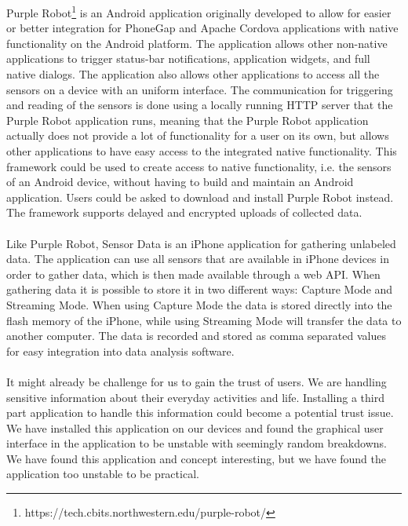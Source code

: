 Purple Robot\footnote{https://tech.cbits.northwestern.edu/purple-robot/} is an Android application originally developed to allow for easier or better integration for PhoneGap and Apache Cordova applications with native functionality on the Android platform. The application allows other non-native applications to trigger status-bar notifications, application widgets, and full native dialogs. 
The application also allows other applications to access all the sensors on a device with an uniform interface. 
The communication for triggering and reading of the sensors is done using a locally running HTTP server that the Purple Robot application runs, meaning that the Purple Robot application actually does not provide a lot of functionality for a user on its own, but allows other applications to have easy access to the integrated native functionality.
This framework could be used to create access to native functionality, i.e. the sensors of an Android device, without having to build and maintain an Android application. Users could be asked to download and install Purple Robot instead. The framework supports delayed and encrypted uploads of collected data. 
\\\\
Like Purple Robot, Sensor Data is an iPhone application for gathering unlabeled data. The application can use all sensors that are available in iPhone devices in order to gather data, which is then made available through a web API. When gathering data it is possible to store it in two different ways: Capture Mode and Streaming Mode. When using Capture Mode the data is stored directly into the flash memory of the iPhone, while using Streaming Mode will transfer the data to another computer. The data is recorded and stored as comma separated values for easy integration into data analysis software.
\\\\
It might already be challenge for us to gain the trust of users. We are handling sensitive information about their everyday activities and life. 
Installing a third part application to handle this information could become a potential trust issue. We have installed this application on our devices and found the graphical user interface in the application to be unstable with seemingly random breakdowns. We have found this application and concept interesting, but we have found the application too unstable to be practical.   

